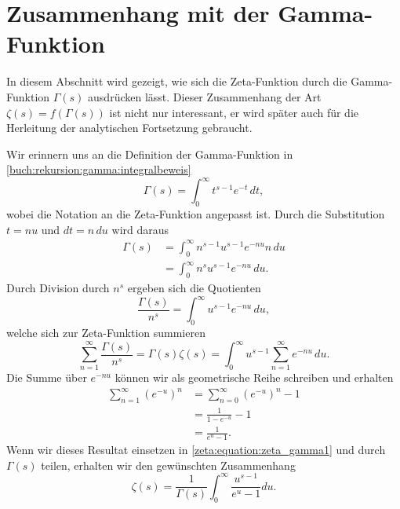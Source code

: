 \section{Zusammenhang mit der Gamma-Funktion} \label{zeta:section:zusammenhang_mit_gammafunktion}

In diesem Abschnitt wird gezeigt, wie sich die Zeta-Funktion durch die Gamma-Funktion $\Gamma(s)$ ausdrücken lässt.
Dieser Zusammenhang der Art $\zeta(s) = f(\Gamma(s))$ ist nicht nur interessant, er wird später auch für die Herleitung der analytischen Fortsetzung gebraucht.

Wir erinnern uns an die Definition der Gamma-Funktion in \eqref{buch:rekursion:gamma:integralbeweis}
\begin{equation*}
    \Gamma(s)
    =
    \int_0^{\infty} t^{s-1} e^{-t} \,dt,
\end{equation*}
wobei die Notation an die Zeta-Funktion angepasst ist.
Durch die Substitution $t = nu$ und $dt = n\,du$ wird daraus
\begin{align*}
    \Gamma(s)
    &=
    \int_0^{\infty} n^{s-1}u^{s-1} e^{-nu} n \,du \\
    &=
    \int_0^{\infty} n^s u^{s-1} e^{-nu} \,du.
\end{align*}
Durch Division durch $n^s$ ergeben sich die Quotienten
\begin{equation*}
    \frac{\Gamma(s)}{n^s}
    =
    \int_0^{\infty} u^{s-1} e^{-nu} \,du,
\end{equation*}
welche sich zur Zeta-Funktion summieren
\begin{equation}
    \sum_{n=1}^{\infty} \frac{\Gamma(s)}{n^s}
    =
    \Gamma(s) \zeta(s)
    =
    \int_0^{\infty} u^{s-1}
    \sum_{n=1}^{\infty}e^{-nu}
    \,du.
    \label{zeta:equation:zeta_gamma1}
\end{equation}
Die Summe über $e^{-nu}$ können wir als geometrische Reihe schreiben und erhalten
\begin{align}
    \sum_{n=1}^{\infty}(e^{-u})^n
    &=
    \sum_{n=0}^{\infty}(e^{-u})^n
    -
    1
    \\
    &=
    \frac{1}{1 - e^{-u}} - 1
    \\
    &=
    \frac{1}{e^u - 1}.
\end{align}
Wenn wir dieses Resultat einsetzen in \eqref{zeta:equation:zeta_gamma1} und durch $\Gamma(s)$ teilen, erhalten wir den gewünschten Zusammenhang
\begin{equation}\label{zeta:equation:zeta_gamma_final}
    \zeta(s)
    =
    \frac{1}{\Gamma(s)}
    \int_0^{\infty}
    \frac{u^{s-1}}{e^u -1}
    du.
\end{equation}
